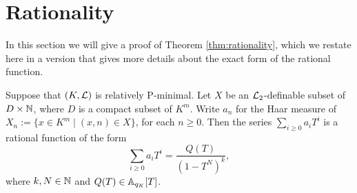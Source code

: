 \section{Rationality}
In this section we will give a proof of Theorem \ref{thm:rationality}, which we restate here in a version that gives more details about the exact form of the rational function. 
\begin{thm}
Suppose that $(K,\cL)$ is relatively P-minimal. Let $X$ be an $\cL_2$-definable subset of $D\times \NN$, where $D$ is a compact subset of $K^m$.  Write $a_n$ for the Haar measure of $X_n:=\{x\in K^m\mid (x,n)\in X\}$, for each $n\geq 0$. Then the series $\sum_{i\geq 0} a_i T^i$ is a rational function of the form
\[\sum_{i\geq 0} a_i T^i = \frac{Q(T) }{(1-T^N)^k},\]
where $k, N \in \N$ and  $Q(T) \in \AA_{q_K}[T]$. 
\end{thm}
